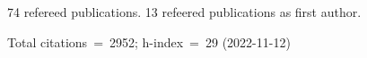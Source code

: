 74 refereed publications. 13 refeered publications as first author.

Total citations~=~2952; h-index~=~29 (2022-11-12)